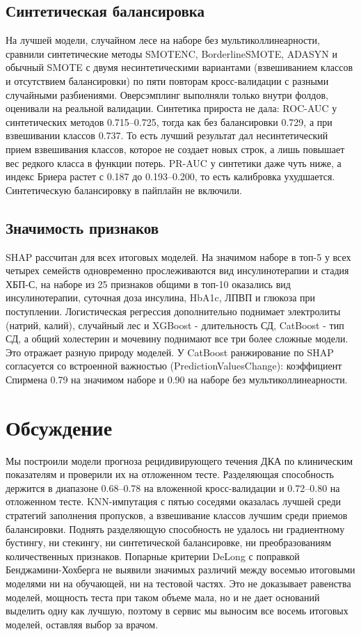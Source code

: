 \documentclass[12pt,a4paper]{article}
\begin{document}
\subsection{Синтетическая балансировка}

На лучшей модели, случайном лесе на наборе без мультиколлинеарности, сравнили синтетические
методы SMOTENC, BorderlineSMOTE, ADASYN и обычный SMOTE с двумя несинтетическими вариантами
(взвешиванием классов и отсутствием балансировки) по пяти повторам кросс-валидации с разными
случайными разбиениями. Оверсэмплинг выполняли только внутри фолдов, оценивали на реальной
валидации. Синтетика прироста не дала: ROC-AUC у синтетических методов 0.715--0.725, тогда
как без балансировки 0.729, а при взвешивании классов 0.737. То есть лучший результат дал
несинтетический прием взвешивания классов, которое не создает новых строк, а лишь повышает
вес редкого класса в функции потерь. PR-AUC у синтетики даже чуть ниже, а индекс Бриера
растет с 0.187 до 0.193--0.200, то есть калибровка ухудшается. Синтетическую балансировку в
пайплайн не включили.

\subsection{Значимость признаков}

SHAP рассчитан для всех итоговых моделей. На значимом наборе в топ-5 у всех четырех семейств
одновременно прослеживаются вид инсулинотерапии и стадия ХБП-С, на наборе из 25 признаков
общими в топ-10 оказались вид инсулинотерапии, суточная доза инсулина, HbA1c, ЛПВП и глюкоза
при поступлении. Логистическая регрессия дополнительно поднимает электролиты (натрий, калий),
случайный лес и XGBoost - длительность СД, CatBoost - тип СД, а общий холестерин и мочевину
поднимают все три более сложные модели. Это отражает разную природу моделей. У CatBoost
ранжирование по SHAP согласуется со встроенной важностью (PredictionValuesChange):
коэффициент Спирмена 0.79 на значимом наборе и 0.90 на наборе без мультиколлинеарности.

\section{Обсуждение}

Мы построили модели прогноза рецидивирующего течения ДКА по клиническим показателям и
проверили их на отложенном тесте. Разделяющая способность держится в диапазоне 0.68--0.78 на
вложенной кросс-валидации и 0.72--0.80 на отложенном тесте. KNN-импутация с пятью соседями
оказалась лучшей среди стратегий заполнения пропусков, а взвешивание классов лучшим среди
приемов балансировки. Поднять разделяющую способность не удалось ни градиентному бустингу, ни
стекингу, ни синтетической балансировке, ни преобразованиям количественных признаков.
Попарные критерии DeLong с поправкой Бенджамини-Хохберга не выявили значимых различий между
восемью итоговыми моделями ни на обучающей, ни на тестовой частях. Это не доказывает
равенства моделей, мощность теста при таком объеме мала, но и не дает оснований выделить одну
как лучшую, поэтому в сервис мы выносим все восемь итоговых моделей, оставляя выбор за врачом.
\end{document}
